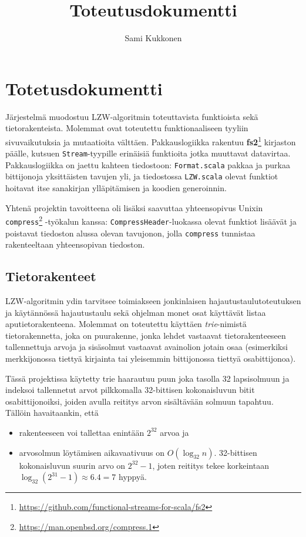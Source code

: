 \documentclass{article}
\title{Toteutusdokumentti}
\author{Sami Kukkonen}
\newcommand{\code}{\texttt}
\begin{document}
\section{Totetusdokumentti}

Järjestelmä muodostuu LZW-algoritmin \cite{Welch1} toteuttavista funktioista sekä tietorakenteista. Molemmat ovat toteutettu funktionaaliseen tyyliin sivuvaikutuksia ja mutaatioita välttäen. \cite[s. 39--60]{Chiusano1}
Pakkauslogiikka rakentuu \textbf{fs2}\footnote{\url{https://github.com/functional-streams-for-scala/fs2}} kirjaston päälle, kutsuen \code{Stream}-tyypille erinäisiä funktioita jotka muuttavat datavirtaa.
Pakkauslogiikka on jaettu kahteen tiedostoon: \code{Format.scala} pakkaa ja purkaa bittijonoja yksittäisten tavujen yli, ja tiedostossa \code{LZW.scala} olevat funktiot hoitavat itse sanakirjan ylläpitämisen ja koodien generoinnin.

Yhtenä projektin tavoitteena oli lisäksi saavuttaa yhteensopivus Unixin \code{compress}\footnote{\url{https://man.openbsd.org/compress.1}} -työkalun kanssa: \code{CompressHeader}-luokassa olevat funktiot lisäävät ja poistavat tiedoston alussa olevan tavujonon, jolla \code{compress} tunnistaa rakenteeltaan yhteensopivan tiedoston.

\subsection{Tietorakenteet}

LZW-algoritmin ydin tarvitsee toimiakseen jonkinlaisen hajautustaulutoteutuksen ja käytännössä
hajautustaulu sekä ohjelman monet osat käyttävät listaa aputietorakenteena. Molemmat on toteutettu
käyttäen \textit{trie}-nimistä tietorakennetta, joka on puurakenne, jonka lehdet vastaavat tietorakenteeseen
tallennettuja arvoja ja sisäsolmut vastaavat avainolion jotain osaa (esimerkiksi merkkijonossa tiettyä kirjainta tai yleisemmin
bittijonossa tiettyä osabittijonoa). \cite{Knuth1}

Tässä projektissa käytetty trie haarautuu puun joka tasolla
32 lapsisolmuun ja indeksoi tallennetut arvot pilkkomalla 32-bittisen kokonaisluvun bitit osabittijonoiksi, joiden avulla
reititys arvon sisältävään solmuun tapahtuu. Tällöin havaitaankin, että

\begin{itemize}
  \item rakenteeseen voi tallettaa enintään $2^{32}$ arvoa ja
  \item
    arvosolmun löytämisen aikavaativuus on $O(\log_{32} n)$. 32-bittisen kokonaisluvun suurin arvo on $2^{32}-1$, joten reititys
    tekee korkeintaan \\ $\log_{32}(2^{31}-1) \approx 6.4 = 7$ hyppyä.
\end{itemize}
\end{document}
